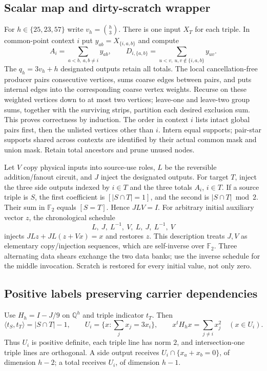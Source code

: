 \subsection{Scalar map and dirty-scratch wrapper}
For $h\in\{25,23,57\}$ write $v_h=\binom h3$. There is one input $X_T$
for each triple. In common-point context $i$ put $y_{ab}=X_{\{i,a,b\}}$
and compute
\[
 A_i=\sum_{a<b,\ a,b\ne i}y_{ab},\qquad
 D_{i,\{a,b\}}=\sum_{u<v,\ u,v\notin\{i,a,b\}}y_{uv}.
\]
The $q_h=3v_h+h$ designated outputs retain all totals. The local
cancellation-free producer pairs consecutive vertices, sums coarse edges
between pairs, and puts internal edges into the corresponding coarse
vertex weights. Recurse on these weighted vertices down to at most two
vertices; leave-one and leave-two group sums, together with the surviving
strips, partition each desired exclusion sum. This proves correctness by
induction. The order in context $i$ lists intact global pairs first, then
the unlisted vertices other than $i$. Intern equal supports; pair-star
supports shared across contexts are identified by their actual common
mask and union mask. Retain total ancestors and prune unused nodes.

Let $V$ copy physical inputs into source-use roles, $L$ be the reversible
addition/fanout circuit, and $J$ inject the designated outputs. For target
$T$, inject the three side outputs indexed by $i\in T$ and the three
totals $A_i$, $i\in T$. If a source triple is $S$, the first coefficient
is $[|S\cap T|=1]$, and the second is $|S\cap T|\bmod2$.
Their sum in $\mathbb F_2$ equals $[S=T]$. Hence $JLV=I$.
For arbitrary initial auxiliary vector $z$, the chronological schedule
\[
 L,\ J,\ L^{-1},\ V,\ L,\ J,\ L^{-1},\ V
\]
injects $JLz+JL(z+Vx)=x$ and restores $z$. This description treats $J,V$
as elementary copy/injection sequences, which are self-inverse over
$\mathbb F_2$. Three alternating data shears exchange the two data banks;
use the inverse schedule for the middle invocation. Scratch is restored
for every initial value, not only zero.

\subsection{Positive labels preserving carrier dependencies}
Use $H_h=I-J/9$ on $\mathbb Q^h$ and triple indicator $t_T$. Then
\[
 \langle t_S,t_T\rangle=|S\cap T|-1,\qquad
 U_i=\{x:\textstyle\sum_jx_j=3x_i\},\qquad
 x^tH_hx=\sum_{j\ne i}x_j^2\quad(x\in U_i).
\]
Thus $U_i$ is positive definite, each triple line has norm $2$, and
intersection-one triple lines are orthogonal. A side output receives
$U_i\cap\{x_a+x_b=0\}$, of dimension $h-2$; a total receives $U_i$,
of dimension $h-1$.

